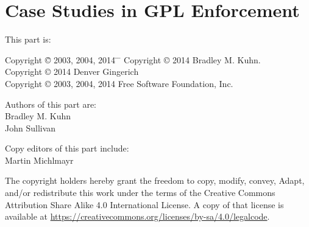 





\part{Case Studies in GPL Enforcement}

{\parindent 0in
This part is: \\
\begin{tabbing}
Copyright \= \copyright{} 2003, 2004, 2014 \hspace{1mm} \= \hspace{1.mm} \=  \kill
Copyright \> \copyright{} 2014 \>  Bradley M. Kuhn. \\
Copyright \> \copyright{} 2014 \>  Denver Gingerich \\
Copyright \> \copyright{} 2003, 2004, 2014 \> Free Software Foundation, Inc. \\
\end{tabbing}

\vspace{1in}

\begin{center}
Authors of this part are: \\

Bradley M. Kuhn \\
John Sullivan
\vspace{3in}

Copy editors of this part include: \\
Martin Michlmayr

\vspace{3in}

The copyright holders hereby grant the freedom to copy, modify, convey,
Adapt, and/or redistribute this work under the terms of the Creative Commons
Attribution Share Alike 4.0 International License.  A copy of that license is
available at \url{https://creativecommons.org/licenses/by-sa/4.0/legalcode}.
\end{center}
}

